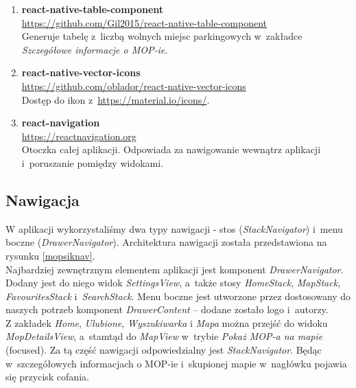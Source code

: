 \begin{enumerate}
\item \textbf{react-native-table-component} \\
\url{https://github.com/Gil2015/react-native-table-component}\\
Generuje tabelę z~liczbą wolnych miejsc parkingowych w~zakładce \textit{Szczegółowe informacje o MOP-ie}.

\item \textbf{react-native-vector-icons} \\
\url{https://github.com/oblador/react-native-vector-icons}\\
Dostęp do ikon z~\url{https://material.io/icons/}.

\item \textbf{react-navigation} \\
\url{https://reactnavigation.org}\\
Otoczka całej aplikacji. Odpowiada za nawigowanie wewnątrz aplikacji i~poruszanie pomiędzy widokami.
\end{enumerate}

\subsection{Nawigacja}
W aplikacji wykorzystaliśmy dwa typy nawigacji - stos (\textit{StackNavigator}) i~menu boczne (\textit{DrawerNavigator}). Architektura nawigacji została przedstawiona na rysunku \ref{mopsiknav}.\\


Najbardziej zewnętrznym elementem aplikacji jest komponent \textit{DrawerNavigator}. Dodany jest do niego widok \textit{SettingsView}, a~także stosy \textit{HomeStack}, \textit{MapStack}, \textit{FavouritesStack} i~\textit{SearchStack}. Menu boczne jest utworzone przez dostosowany do naszych potrzeb komponent \textit{DrawerContent} -- dodane zostało logo i~autorzy. \\

Z zakładek \textit{Home}, \textit{Ulubione}, \textit{Wyszukiwarka} i
\textit{Mapa} można przejść do widoku \textit{MopDetailsView}, a~stamtąd do
\textit{MapView} w~trybie \textit{Pokaż MOP-a na mapie} (focused). Za tą część
nawigacji odpowiedzialny jest \textit{StackNavigator}. Będąc w~szczegółowych informacjach o MOP-ie i~skupionej mapie w~nagłówku pojawia się przycisk cofania.\\


